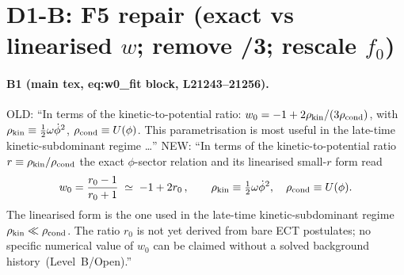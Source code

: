 \section*{D1-B: F5 repair (exact vs linearised $w$; remove /3;
rescale $f_0$)}

\paragraph{B1 (main tex, eq:w0\_fit block, L21243--21256).}
OLD: ``In terms of the kinetic-to-potential ratio:
$w_0=-1+2\rho_{\rm kin}/(3\rho_{\rm cond})$, with
$\rho_{\rm kin}\equiv\frac12\omega\dot\phi^2$,
$\rho_{\rm cond}\equiv U(\phi)$. This parametrisation is most
useful in the late-time kinetic-subdominant regime \ldots''
NEW: ``In terms of the kinetic-to-potential ratio
$r\equiv\rho_{\rm kin}/\rho_{\rm cond}$ the exact $\phi$-sector
relation and its linearised small-$r$ form read
\begin{equation}
  \label{eq:w0\_fit}
  w_0=\frac{r_0-1}{r_0+1}\;\simeq\;-1+2r_0\,, \qquad
  \rho_{\rm kin}\equiv\tfrac12\omega\dot\phi^2,\quad
  \rho_{\rm cond}\equiv U(\phi).
\end{equation}
The linearised form is the one used in the late-time
kinetic-subdominant regime $\rho_{\rm kin}\ll\rho_{\rm cond}$.
The ratio $r_0$ is not yet derived from bare ECT postulates; no
specific numerical value of $w_0$ can be claimed without a
solved background history~(Level~B/Open).''

